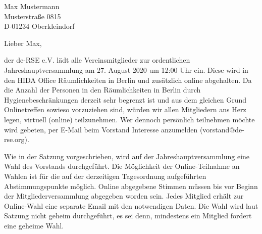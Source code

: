 \documentclass[../Vorlagen/de-RSE_Brief,a4paper]{scrlttr2}
\begin{document}

\begin{letter}{
    Max Mustermann\\
    Musterstraße 0815\\
    D-01234 Oberkleindorf
}
\opening{Lieber Max,}

der de-RSE e.V. lädt alle Vereinsmitglieder zur ordentlichen Jahreshauptversammlung am 27. August 2020 um 12:00 Uhr ein.
Diese wird in den HIDA Office Räumlichkeiten in Berlin und zusätzlich online abgehalten. 
Da die Anzahl der Personen in den Räumlichkeiten in Berlin durch Hygienebeschränkungen derzeit sehr begrenzt ist und aus dem gleichen Grund Onlinetreffen sowieso vorzuziehen sind, würden wir allen Mitgliedern ans Herz legen, virtuell (online) teilzunehmen. 
Wer dennoch persönlich teilnehmen möchte wird gebeten, per E-Mail beim Vorstand Interesse anzumelden (vorstand@de-rse.org).

Wie in der Satzung vorgeschrieben, wird auf der Jahreshauptversammlung eine Wahl des Vorstands durchgeführt.
Die Möglichkeit der Online-Teilnahme an Wahlen ist für die auf der derzeitigen Tagesordnung aufgeführten Abstimmungspunkte möglich.
Online abgegebene Stimmen müssen bis vor Beginn der Mitgliederversammlung abgegeben worden sein.
Jedes Mitglied erhält zur Online-Wahl eine separate Email mit den notwendigen Daten.
Die Wahl wird laut Satzung nicht geheim durchgeführt, es sei denn, mindestens ein Mitglied fordert eine geheime Wahl.


\end{letter}
\end{document}
